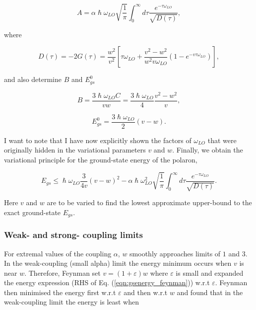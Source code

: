 \begin{equation}
    A = \alpha\hslash\omega_{LO}\sqrt{\frac{1}{\pi}}\int^{\infty}_0 d\tau \frac{e^{-\tau \omega_{LO}}}{\sqrt{ D(\tau)}},
\end{equation}

where

\begin{equation}\label{eqn:FD}
    D(\tau) = -2 G(\tau) = \frac{w^2}{v^2} \left[\tau \omega_{LO} + \frac{v^2-w^2}{w^2 v \omega_{LO}} \left(1-e^{-v\tau\omega_{LO}} \right)\right],
\end{equation}

and also determine $B$ and $E^0_{gs}$

\begin{equation}
    B = \frac{3\hslash\omega_{LO} C}{v w} = \frac{3\hslash\omega_{LO}}{4} \frac{v^2-w^2}{v},
\end{equation}

\begin{equation}
    E^0_{gs} = \frac{3 \hslash \omega_{LO}}{2}(v - w).
\end{equation}

I want to note that I have now explicitly shown the factors of $\omega_{LO}$ that were originally hidden in the variational parameters $v$ and $w$. Finally, we obtain the variational principle for the ground-state energy of the polaron,

\begin{equation}
    \label{eqn:gsenergy_feynman}
    E_{gs} \leq \hslash \omega_{LO}\frac{3}{4 v} \left(v-w\right)^2 - \alpha\hslash\omega^2_{LO}\sqrt{\frac{1}{\pi}}\int^{\infty}_0 d\tau \frac{e^{-\tau \omega_{LO}}}{\sqrt{ D(\tau)}}.
\end{equation}

Here $v$ and $w$ are to be varied to find the lowest approximate upper-bound to the exact ground-state $E_{gs}$. 

\subsubsection{Weak- and strong- coupling limits}

For extremal values of the coupling $\alpha$, $w$ smoothly approaches limits of $1$ and $3$. In the weak-coupling (small alpha) limit the energy minimum occurs when $v$ is near $w$. Therefore, Feynman set $v = (1 + \varepsilon) w$ where $\varepsilon$ is small and expanded the energy expression (RHS of Eq. (\ref{eqn:gsenergy_feynman})) w.r.t $\varepsilon$. Feynman then minimised the energy first w.r.t $\varepsilon$ and then w.r.t $w$ and found that in the weak-coupling limit the energy is least when

